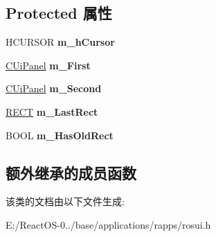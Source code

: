 \subsection*{Protected 属性}
\begin{DoxyCompactItemize}
\item 
\mbox{\label{class_c_ui_split_panel_aa95147092c6a4e7aacf803f5902bcd6e}} 
H\+C\+U\+R\+S\+OR {\bfseries m\+\_\+h\+Cursor}
\item 
\mbox{\label{class_c_ui_split_panel_ad770b1ef36413f813f81222557c36c21}} 
\hyperlink{class_c_ui_panel}{C\+Ui\+Panel} {\bfseries m\+\_\+\+First}
\item 
\mbox{\label{class_c_ui_split_panel_a42c80c68e8857b3a74e345a8c4ff4e53}} 
\hyperlink{class_c_ui_panel}{C\+Ui\+Panel} {\bfseries m\+\_\+\+Second}
\item 
\mbox{\label{class_c_ui_split_panel_a34f86392dd436d8b8bf67f6b8cf27820}} 
\hyperlink{structtag_r_e_c_t}{R\+E\+CT} {\bfseries m\+\_\+\+Last\+Rect}
\item 
\mbox{\label{class_c_ui_split_panel_abe25967a9d8466dd7c02abbf1b4a5c71}} 
B\+O\+OL {\bfseries m\+\_\+\+Has\+Old\+Rect}
\end{DoxyCompactItemize}
\subsection*{额外继承的成员函数}


该类的文档由以下文件生成\+:\begin{DoxyCompactItemize}
\item 
E\+:/\+React\+O\+S-\/0../base/applications/rapps/rosui.\+h\end{DoxyCompactItemize}
